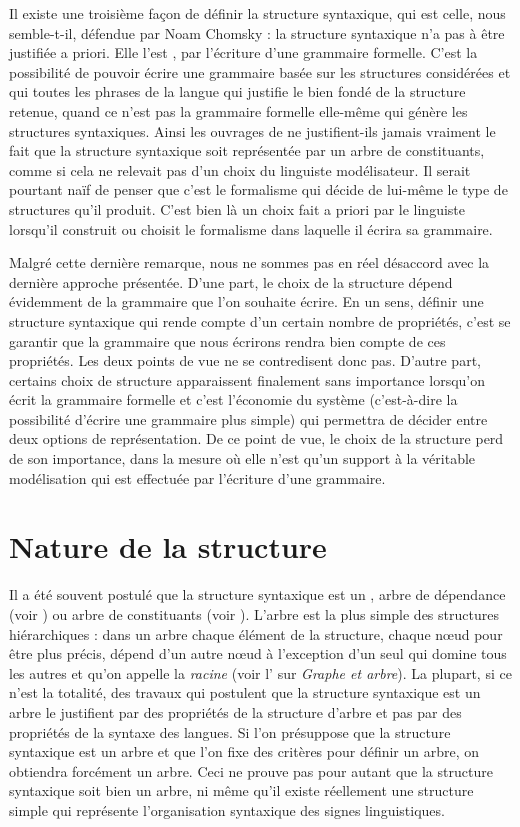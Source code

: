 {    Il existe une troisième façon de définir la structure syntaxique, qui est celle, nous semble-t-il, défendue par Noam Chomsky : la structure syntaxique n’a pas à être justifiée a priori. Elle l’est , par l’écriture d’une grammaire formelle. C’est la possibilité de pouvoir écrire une grammaire basée sur les structures considérées et qui  toutes les phrases de la langue qui justifie le bien fondé de la structure retenue, quand ce n’est pas la grammaire formelle elle-même qui génère les structures syntaxiques. Ainsi les ouvrages de  ne justifient-ils jamais vraiment le fait que la structure syntaxique soit représentée par un arbre de constituants, comme si cela ne relevait pas d’un choix du linguiste modélisateur. Il serait pourtant naïf de penser que c’est le formalisme qui décide de lui-même le type de structures qu’il produit. C’est bien là un choix fait a priori par le linguiste lorsqu’il construit ou choisit le formalisme dans laquelle il écrira sa grammaire.

    Malgré cette dernière remarque, nous ne sommes pas en réel désaccord avec la dernière approche présentée. D’une part, le choix de la structure dépend évidemment de la grammaire que l’on souhaite écrire. En un sens, définir une structure syntaxique qui rende compte d’un certain nombre de propriétés, c’est se garantir que la grammaire que nous écrirons rendra bien compte de ces propriétés. Les deux points de vue ne se contredisent donc pas. D’autre part, certains choix de structure apparaissent finalement sans importance lorsqu’on écrit la grammaire formelle et c’est l’économie du système (c’est-à-dire la possibilité d’écrire une grammaire plus simple) qui permettra de décider entre deux options de représentation. De ce point de vue, le choix de la structure perd de son importance, dans la mesure où elle n’est qu’un support à la véritable modélisation qui est effectuée par l’écriture d’une grammaire.
}
\section{Nature de la structure}\label{sec:3.2.4}

Il a été souvent postulé que la structure syntaxique est un , arbre de dépendance (voir ) ou arbre de constituants (voir ). L’arbre est la plus simple des structures hiérarchiques : dans un arbre chaque élément de la structure, chaque nœud pour être plus précis, dépend d’un autre nœud à l’exception d’un seul qui domine tous les autres et qu’on appelle la \textit{racine} (voir l' sur \textit{Graphe et arbre}). La plupart, si ce n’est la totalité, des travaux qui postulent que la structure syntaxique est un arbre le justifient par des propriétés de la structure d’arbre et pas par des propriétés de la syntaxe des langues. Si l’on présuppose que la structure syntaxique est un arbre et que l’on fixe des critères pour définir un arbre, on obtiendra forcément un arbre. Ceci ne prouve pas pour autant que la structure syntaxique soit bien un arbre, ni même qu’il existe réellement une structure simple qui représente l’organisation syntaxique des signes linguistiques.

